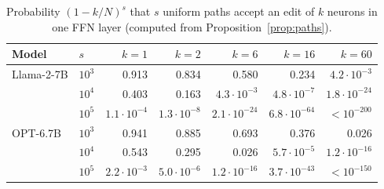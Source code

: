 \begin{table}[t]
  \caption{Probability $(1-k/N)^s$ that $s$ uniform paths accept an edit of $k$ neurons in one FFN
  layer (computed from Proposition~\ref{prop:paths}).}
  \label{tab:paths-acc}
  \centering\footnotesize
  \setlength{\tabcolsep}{3.5pt}
  \begin{tabular}{@{}llrrrrr@{}}
    \toprule
    Model & $s$ & $k=1$ & $k=2$ & $k=6$ & $k=16$ & $k=60$ \\
    \midrule
    Llama-2-7B & $10^3$ & 0.913 & 0.834 & 0.580 & 0.234 & $4.2\cdot10^{-3}$ \\
               & $10^4$ & 0.403 & 0.163 & $4.3\cdot10^{-3}$ & $4.8\cdot10^{-7}$ & $1.8\cdot10^{-24}$ \\
               & $10^5$ & $1.1\cdot10^{-4}$ & $1.3\cdot10^{-8}$ & $2.1\cdot10^{-24}$ & $6.8\cdot10^{-64}$ & $<10^{-200}$ \\
    \midrule
    OPT-6.7B   & $10^3$ & 0.941 & 0.885 & 0.693 & 0.376 & 0.026 \\
               & $10^4$ & 0.543 & 0.295 & 0.026 & $5.7\cdot10^{-5}$ & $1.2\cdot10^{-16}$ \\
               & $10^5$ & $2.2\cdot10^{-3}$ & $5.0\cdot10^{-6}$ & $1.2\cdot10^{-16}$ & $3.7\cdot10^{-43}$ & $<10^{-150}$ \\
    \bottomrule
  \end{tabular}
\end{table}
